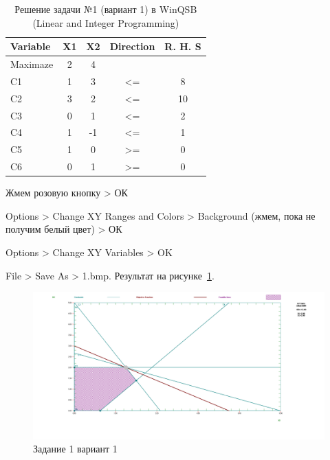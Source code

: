 \begin{table}[h!]
  \scriptsize

  \centering

  \caption{Решение задачи №1 (вариант 1) в WinQSB (Linear and Integer Programming)}
  \label{tab:1_1}

  \begin{tabular}{ |l||c|c|c|c| } 
    \hline
    Variable & X1 & X2 & Direction & R. H. S \\ \hline
    \hline
    Maximaze & 2 & 4 &  & \\ \hline
    C1 & 1 & 3 & <= & 8 \\ \hline
    C2 & 3 & 2 & <= & 10 \\ \hline
    C3 & 0 & 1 & <= & 2 \\ \hline
    C4 & 1 & -1 & <= & 1 \\ \hline
    C5 & 1 & 0 & >= & 0 \\ \hline
    C6 & 0 & 1 & >= & 0 \\ \hline
  \end{tabular}
\end{table}

Жмем розовую кнопку > ОК

Options > Change XY Ranges and Colors > Background (жмем, пока не получим белый цвет) > ОК

Options > Change XY Variables > OK

File > Save As > 1.bmp. Результат на рисунке~\ref{fig:result1_option1}.

\begin{figure}[!htb]
  \centering

  \includegraphics[width=18cm]
  {inc/result1_option1.png}

  \caption{Задание 1 вариант 1}
  \label{fig:result1_option1}
\end{figure}


